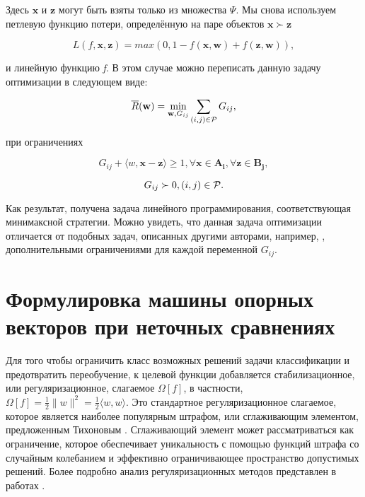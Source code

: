 \documentclass[12pt,a4paper,oneside]{article}
\begin{document}
\par
Здесь \(\mathbf{x}\) и \(\mathbf{z}\) могут быть взяты только из множества \(\Psi\). 
Мы снова используем петлевую функцию потери, определённую на паре объектов \(\mathbf{x} \succ \mathbf{z}\)

\[
L(f, \mathbf{x}, \mathbf{z}) = max (0,1 - f(\mathbf{x}, \mathbf{w}) + f(\mathbf{z}, \mathbf{w})),
\]

\par
и линейную функцию \emph{f}. 
В этом случае можно переписать данную задачу оптимизации в следующем виде:

\[
\overline{R}(\mathbf{w}) = \underset{\mathbf{w}, G_{ij}}{\operatorname{min}} \sum \limits_{(i, j) \in \mathcal{P}} G_{ij},
\]

\par
при ограничениях

\[
G_{ij} + \langle w, \mathbf{x} - \mathbf{z} \rangle \geq 1, \forall \mathbf{x} \in \mathbf{A_i}, \forall \mathbf{z} \in \mathbf{B_j}, 
\]

\[
G_{ij} \succ 0, (i, j) \in \mathcal{P}.
\]

\par
Как результат, получена задача линейного программирования, соответствующая минимаксной стратегии. 
Можно увидеть, что данная задача оптимизации отличается от подобных задач, описанных другими авторами, например, , дополнительными ограничениями для каждой переменной \(G_{ij}\). 


\section{Формулировка машины опорных векторов при неточных сравнениях}
\label{sec:svm_by_imprecise_comparisons}

\par
Для того чтобы ограничить класс возможных решений задачи классификации и предотвратить переобучение, к целевой функции добавляется стабилизационное, или регуляризационное, слагаемое \(\Omega[f]\), в частности, \(\Omega[f] = \frac{1}{2}\|w\|^2 = \frac{1}{2} \langle w, w \rangle \). 
Это стандартное регуляризационное слагаемое, которое является наиболее популярным штрафом, или сглаживающим элементом, предложенным Тихоновым . 
Сглаживающий элемент может рассматриваться как ограничение, которое обеспечивает уникальность с помощью функций штрафа со случайным колебанием и эффективно ограничивающее пространство допустимых решений. 
Более подробно анализ регуляризационных методов представлен в работах . 
\end{document}
